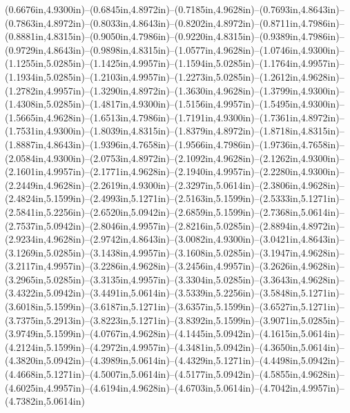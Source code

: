 (0.6676in,4.9300in)--(0.6845in,4.8972in)--(0.7185in,4.9628in)--(0.7693in,4.8643in)--(0.7863in,4.8972in)--(0.8033in,4.8643in)--(0.8202in,4.8972in)--(0.8711in,4.7986in)--(0.8881in,4.8315in)--(0.9050in,4.7986in)--(0.9220in,4.8315in)--(0.9389in,4.7986in)--(0.9729in,4.8643in)--(0.9898in,4.8315in)--(1.0577in,4.9628in)--(1.0746in,4.9300in)--(1.1255in,5.0285in)--(1.1425in,4.9957in)--(1.1594in,5.0285in)--(1.1764in,4.9957in)--(1.1934in,5.0285in)--(1.2103in,4.9957in)--(1.2273in,5.0285in)--(1.2612in,4.9628in)--(1.2782in,4.9957in)--(1.3290in,4.8972in)--(1.3630in,4.9628in)--(1.3799in,4.9300in)--(1.4308in,5.0285in)--(1.4817in,4.9300in)--(1.5156in,4.9957in)--(1.5495in,4.9300in)--(1.5665in,4.9628in)--(1.6513in,4.7986in)--(1.7191in,4.9300in)--(1.7361in,4.8972in)--(1.7531in,4.9300in)--(1.8039in,4.8315in)--(1.8379in,4.8972in)--(1.8718in,4.8315in)--(1.8887in,4.8643in)--(1.9396in,4.7658in)--(1.9566in,4.7986in)--(1.9736in,4.7658in)--(2.0584in,4.9300in)--(2.0753in,4.8972in)--(2.1092in,4.9628in)--(2.1262in,4.9300in)--(2.1601in,4.9957in)--(2.1771in,4.9628in)--(2.1940in,4.9957in)--(2.2280in,4.9300in)--(2.2449in,4.9628in)--(2.2619in,4.9300in)--(2.3297in,5.0614in)--(2.3806in,4.9628in)--(2.4824in,5.1599in)--(2.4993in,5.1271in)--(2.5163in,5.1599in)--(2.5333in,5.1271in)--(2.5841in,5.2256in)--(2.6520in,5.0942in)--(2.6859in,5.1599in)--(2.7368in,5.0614in)--(2.7537in,5.0942in)--(2.8046in,4.9957in)--(2.8216in,5.0285in)--(2.8894in,4.8972in)--(2.9234in,4.9628in)--(2.9742in,4.8643in)--(3.0082in,4.9300in)--(3.0421in,4.8643in)--(3.1269in,5.0285in)--(3.1438in,4.9957in)--(3.1608in,5.0285in)--(3.1947in,4.9628in)--(3.2117in,4.9957in)--(3.2286in,4.9628in)--(3.2456in,4.9957in)--(3.2626in,4.9628in)--(3.2965in,5.0285in)--(3.3135in,4.9957in)--(3.3304in,5.0285in)--(3.3643in,4.9628in)--(3.4322in,5.0942in)--(3.4491in,5.0614in)--(3.5339in,5.2256in)--(3.5848in,5.1271in)--(3.6018in,5.1599in)--(3.6187in,5.1271in)--(3.6357in,5.1599in)--(3.6527in,5.1271in)--(3.7375in,5.2913in)--(3.8223in,5.1271in)--(3.8392in,5.1599in)--(3.9071in,5.0285in)--(3.9749in,5.1599in)--(4.0767in,4.9628in)--(4.1445in,5.0942in)--(4.1615in,5.0614in)--(4.2124in,5.1599in)--(4.2972in,4.9957in)--(4.3481in,5.0942in)--(4.3650in,5.0614in)--(4.3820in,5.0942in)--(4.3989in,5.0614in)--(4.4329in,5.1271in)--(4.4498in,5.0942in)--(4.4668in,5.1271in)--(4.5007in,5.0614in)--(4.5177in,5.0942in)--(4.5855in,4.9628in)--(4.6025in,4.9957in)--(4.6194in,4.9628in)--(4.6703in,5.0614in)--(4.7042in,4.9957in)--(4.7382in,5.0614in)
